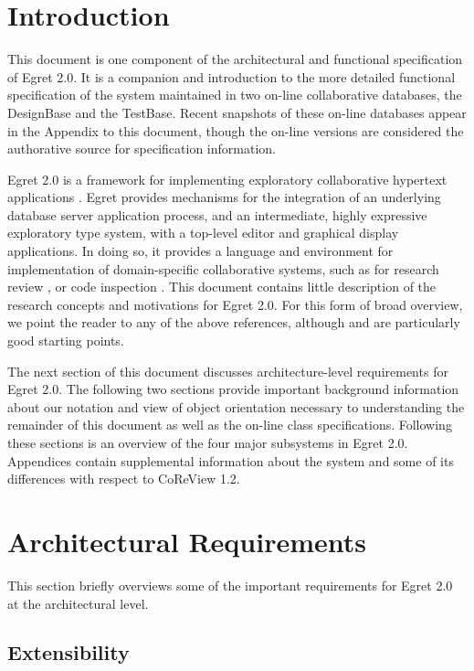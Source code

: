 \section{Introduction}

This document is one component of the architectural and functional
specification of Egret 2.0. It is a companion and introduction to the
more detailed functional specification of the system maintained in two
on-line collaborative databases, the DesignBase and the TestBase.
Recent snapshots of these on-line databases appear in the Appendix to
this document, though the on-line versions are considered the
authorative source for specification information.

Egret 2.0 is a framework for implementing exploratory collaborative
hypertext applications \cite{csdl-91-03,csdl-92-01}.  Egret provides
mechanisms for the integration of an underlying database server
application process, and an intermediate, highly expressive
exploratory type system, with a top-level editor and graphical display
applications.  In doing so, it provides a language and environment for
implementation of domain-specific collaborative systems, such as for
research review \cite{csdl-92-03,csdl-92-05}, or code inspection
\cite{csdl-92-04}.  This document contains little description of the
research concepts and motivations for Egret 2.0. For this form of
broad overview, we point the reader to any of the above references,
although \cite{csdl-92-01} and \cite{csdl-92-03} are particularly good
starting points.

The next section of this document discusses architecture-level
requirements for Egret 2.0.  The following two sections provide
important background information about our notation and view of object
orientation necessary to understanding the remainder of this document
as well as the on-line class specifications.  Following these sections
is an overview of the four major subsystems in Egret 2.0.  Appendices
contain supplemental information about the system and some of its
differences with respect to CoReView 1.2.

\section{Architectural Requirements}

This section briefly overviews some of the important requirements for 
Egret 2.0 at the architectural level.  

\subsection{Extensibility}  

